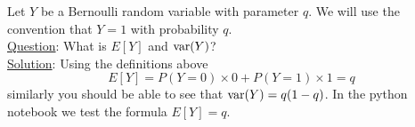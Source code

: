 \begin{itemize}
\end{itemize}


\begin{example}
Let $Y$ be a Bernoulli random variable with parameter $q$. We will use the convention that $Y=1$ with probability $q$.\\


\noindent
\underline{Question}: What is $E[Y]$ and ${\rm var}(Y)$?\\

\noindent
\underline{Solution}: Using the definitions above
\begin{equation*}
E[Y] = P(Y=0)\times 0 + P(Y=1)\times 1 = q
\end{equation*}
similarly you should be able to see that ${\rm var}(Y) = q(1-q)$. 
In the python notebook we test the formula $E[Y]=q$. 
\end{example}

